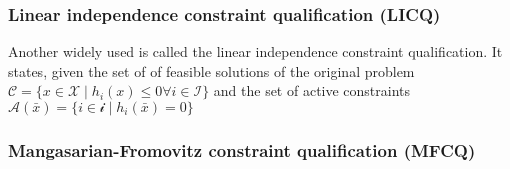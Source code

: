     \subsubsection{Linear independence constraint qualification (LICQ)}
    Another widely used is called the linear independence constraint qualification. It states,
    given the set of of feasible solutions of the original problem $\mathcal{C} = \{x \in \mathcal{X} \; | \; h_i(x) \leq 0
    \forall i \in \mathcal{I} \}$ and the set of active constraints $\mathcal{A}(\bar{x}) = \{i \in \mathcal{i} \; | \; h_i(\bar{x}) = 0 \}$

    \subsubsection{Mangasarian-Fromovitz constraint qualification (MFCQ)}
    
    
    